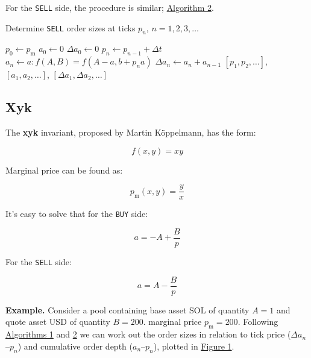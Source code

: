 \documentclass{article}
\begin{document}
For the \texttt{SELL} side, the procedure is similar; \hyperref[alg:2]{Algorithm 2}.

\begin{algorithm}
  \caption{Determine \texttt{SELL} order sizes at ticks $p_n$, $n = 1, 2, 3, \dots$}
  \label{alg:2}
  \begin{algorithmic}
    \State $p_0 \gets p_{\mathrm{m}}$
    \State $a_0 \gets 0$
    \State $\Delta a_0 \gets 0$
    \State $p_n \gets p_{n-1} + \Delta t$
    \State $a_n \gets a: f(A, B) = f(A - a, b + p_n a)$ 
    \State $\Delta a_n \gets a_n + a_{n-1}$
    \EndFor
    \State \Return $[p_1, p_2, \dots]$, $[a_1, a_2, \dots]$, $[\Delta a_1, \Delta a_2, \dots]$
  \end{algorithmic}
\end{algorithm}

\subsection{Xyk}

The \textbf{xyk} invariant, proposed by Martin Köppelmann,\supercite{xykamm} has the form:

\begin{equation}
  f(x, y) = xy
\end{equation}

Marginal price can be found as:

\begin{equation}
  p_{\mathrm{m}} (x, y) = \frac{y}{x}
\end{equation}

It's easy to solve that for the \texttt{BUY} side:

\begin{equation}
  a = -A + \frac{B}{p}
\end{equation}

For the \texttt{SELL} side:

\begin{equation}
  a = A - \frac{B}{p}
\end{equation}

\textbf{Example.} Consider a pool containing base asset SOL of quantity $A = 1$ and quote asset USD of quantity $B = 200$. marginal price $p_{\mathrm{m}} = 200$. Following \hyperref[alg:1]{Algorithms 1} and \hyperref[alg:2]{2} we can work out the order sizes in relation to tick price ($\Delta a_n$--$p_n$) and cumulative order depth ($a_n$--$p_n$), plotted in \hyperref[fig:1]{Figure 1}.
\end{document}

